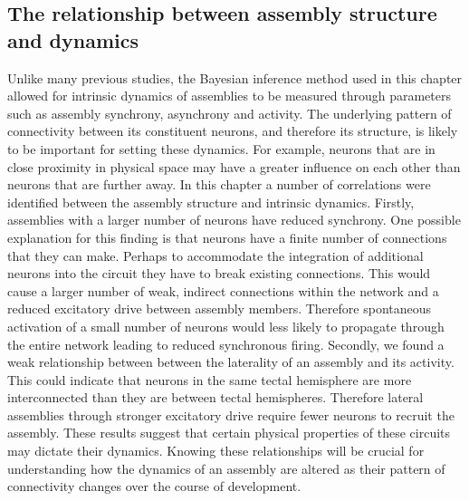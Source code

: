 \subsection{The relationship between assembly structure and dynamics}
 Unlike many previous studies, the Bayesian inference method used in this chapter allowed for intrinsic dynamics of assemblies to be measured through parameters such as assembly synchrony, asynchrony and activity. The underlying pattern of connectivity between its constituent neurons, and therefore its structure,  is likely to be important for setting these dynamics. For example, neurons that are in close proximity in physical space may have a greater influence on each other than neurons that are further away. In this chapter a number of correlations were identified between the assembly structure and  intrinsic dynamics. Firstly,  assemblies with a larger number of neurons have reduced synchrony. One possible explanation for this finding is that neurons have a finite number of connections that they can make. Perhaps to accommodate the integration of additional neurons into the circuit they have to break existing connections. This would cause a larger number of weak, indirect connections within the network and a reduced excitatory drive between assembly members. Therefore spontaneous activation of a small number of neurons would less likely to propagate through the entire network leading to reduced synchronous firing. Secondly, we found a weak relationship between between the laterality of an assembly and its activity. This could indicate that neurons in the same tectal hemisphere are more interconnected than they are between tectal hemispheres. Therefore lateral assemblies through stronger excitatory drive require fewer neurons to recruit the assembly. These results suggest that certain physical properties of these circuits may dictate their dynamics.  Knowing these relationships will be crucial for understanding how the dynamics of an assembly are altered as their pattern of connectivity changes over the course of development.
 
